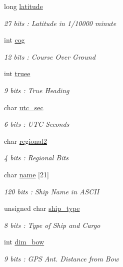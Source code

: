 \begin{DoxyCompactItemize}
long \mbox{\hyperlink{structaismsg__19_afab8fdc41577f60bac38aecfefb89c73}{latitude}}
\begin{DoxyCompactList}\small\item\em 27 bits \+: Latitude in 1/10000 minute \end{DoxyCompactList}\item 
int \mbox{\hyperlink{structaismsg__19_a24a0be344fee0ebebd333b2569ba899f}{cog}}
\begin{DoxyCompactList}\small\item\em 12 bits \+: Course Over Ground \end{DoxyCompactList}\item 
int \mbox{\hyperlink{structaismsg__19_a2fe4fcd488faced6657ec03fed79ad36}{truee}}
\begin{DoxyCompactList}\small\item\em 9 bits \+: True Heading \end{DoxyCompactList}\item 
char \mbox{\hyperlink{structaismsg__19_a3f6d4d190a93ec0c33318ca8d8c8ff5c}{utc\+\_\+sec}}
\begin{DoxyCompactList}\small\item\em 6 bits \+: U\+TC Seconds \end{DoxyCompactList}\item 
char \mbox{\hyperlink{structaismsg__19_a13763f57cff0c509336b32984eb286bd}{regional2}}
\begin{DoxyCompactList}\small\item\em 4 bits \+: Regional Bits \end{DoxyCompactList}\item 
char \mbox{\hyperlink{structaismsg__19_a099f998a1e11d3f6a25782e1fb86dbd1}{name}} \mbox{[}21\mbox{]}
\begin{DoxyCompactList}\small\item\em 120 bits \+: Ship Name in A\+S\+C\+II \end{DoxyCompactList}\item 
unsigned char \mbox{\hyperlink{structaismsg__19_a48bd484c48c54a9c5da019c6409ccbf5}{ship\+\_\+type}}
\begin{DoxyCompactList}\small\item\em 8 bits \+: Type of Ship and Cargo \end{DoxyCompactList}\item 
int \mbox{\hyperlink{structaismsg__19_a6d2b5390fa66f946730b37f49ec1daf6}{dim\+\_\+bow}}
\begin{DoxyCompactList}\small\item\em 9 bits \+: G\+PS Ant. Distance from Bow \end{DoxyCompactList}\item 

\end{DoxyCompactItemize}
